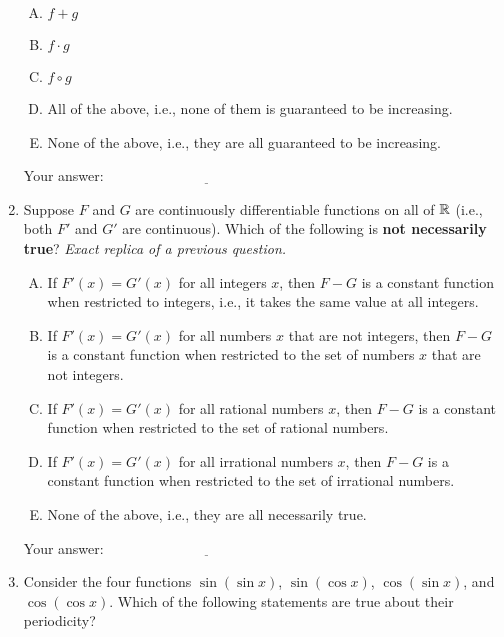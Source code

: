 \documentclass[10pt]{amsart}
\begin{document}
\begin{enumerate}
  \begin{enumerate}[(A)]

  \item $f + g$
  \item $f \cdot g$
  \item $f \circ g$
  \item All of the above, i.e., none of them is guaranteed to be increasing.
  \item None of the above, i.e., they are all guaranteed to be increasing.
  \end{enumerate}

  
\vspace{0.05in}
  Your answer: $\underline{\qquad\qquad\qquad\qquad\qquad\qquad\qquad}$
\vspace{0.05in}
  

\item Suppose $F$ and $G$ are continuously differentiable functions on
  all of $\mathbb{R}$ (i.e., both $F'$ and $G'$ are continuous). Which of the
  following is {\bf not necessarily true}? {\em Exact replica of a
  previous question.}

  \begin{enumerate}[(A)]
  \item If $F'(x) = G'(x)$ for all integers $x$, then $F - G$ is a
    constant function when restricted to integers, i.e., it takes the
    same value at all integers.
  \item If $F'(x) = G'(x)$ for all numbers $x$ that are not integers,
    then $F - G$ is a constant function when restricted to the set of
    numbers $x$ that are not integers.
  \item If $F'(x) = G'(x)$ for all rational numbers $x$, then $F - G$
    is a constant function when restricted to the set of rational
    numbers.
  \item If $F'(x) = G'(x)$ for all irrational numbers $x$, then $F -
    G$ is a constant function when restricted to the set of irrational
    numbers.
  \item None of the above, i.e., they are all necessarily true.
  \end{enumerate}

  
\vspace{0.05in}
  Your answer: $\underline{\qquad\qquad\qquad\qquad\qquad\qquad\qquad}$
\vspace{0.05in}
  

\item Consider the four functions $\sin(\sin x)$, $\sin(\cos x)$,
  $\cos(\sin x)$, and $\cos(\cos x)$. Which of the following
  statements are true about their periodicity?


\end{enumerate}
\end{document}
